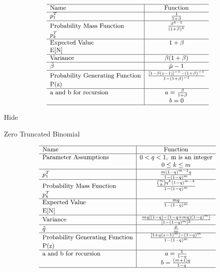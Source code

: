 \documentclass[]{book}
\begin{document}
\[
{\small
\begin{matrix}
\begin{array}{l|c}
\hline
  \text{Name} & \text{Function} \\
\hline
  p^T_1 & \frac{1}{1+\beta} \\
\hline
  \text{Probability Mass Function} & \frac{\beta^{k-1}}{(1+\beta)^k} \\
  p^T_k & \\
\hline
  \text{Expected Value} & 1+\beta \\
  \mathrm{E[N]} & \\
\hline
  \text{Variance} & \beta(1+\beta) \\
\hline
  \tilde\beta & \hat\mu-1 \\
\hline
  \text{Probability Generating Function} & \frac{[1-\beta(z-1)]^{-1}-(1+\beta)^{-1}}{1-(1+\beta)^{-1}} \\
  \mathrm{P(z)} & \\
\hline
  \text{a and b for recursion} & a=\frac{\beta}{1+\beta} \\
   & b=0 \\
\hline
\end{array}
\end{matrix}
}
\]

\hypertarget{ztC}{}
{Hide}

Zero Truncated Binomial

\[
{\small
\begin{matrix}
\begin{array}{l|c}
\hline
  \text{Name} & \text{Function} \\
\hline
  \text{Parameter Assumptions} & 0<q<1,~\text{m is an integer} \\
   & 0 \leq k \leq m\\
\hline
  p^T_1 & \frac{m(1-q)^{m-1}q}{1-(1-q)^m} \\
\hline
  \text{Probability Mass Function} & \frac{\binom{m}{k}q^k(1-q)^{m-k}}{1-(1-q)^m} \\
  p^T_k & \\
\hline
  \text{Expected Value} & \frac{mq}{1-(1-q)^m} \\
  \mathrm{E[N]} & \\
\hline
  \text{Variance} & \frac{mq[(1-q)-(1-q+mq)(1-q)^m]}{[1-(1-q)^m]^2} \\
\hline
  \tilde q & \frac{\hat\mu}{m} \\
\hline
  \text{Probability Generating Function} & \frac{[1+q(z-1)^m]-(1-q)^m}{1-(1-q)^m} \\
  \mathrm{P(z)} & \\
\hline
  \text{a and b for recursion} & a=\frac{1}{1-q} \\
   & b=\frac{(m+1)q}{1-q} \\
\hline
\end{array}
\end{matrix}
}
\]
\end{document}

